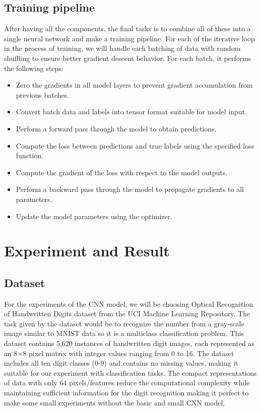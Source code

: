 \documentclass[conference]{IEEEtran}
\begin{document}
\subsection{Training pipeline} After having all the components, the final tasks is to combine all of these into a single neural network and make a training pipeline. For each of the iterative loop in the process of training, we will handle each batching of data with random shuffling to ensure better gradient descent behavior. For each batch, it performs the following steps:
\begin{itemize}
  \item Zero the gradients in all model layers to prevent gradient accumulation from previous batches.
  \item Convert batch data and labels into tensor format suitable for model input.
  \item Perform a forward pass through the model to obtain predictions.
  \item Compute the loss between predictions and true labels using the specified loss function.
  \item Compute the gradient of the loss with respect to the model outputs.
  \item Perform a backward pass through the model to propagate gradients to all parameters.
  \item Update the model parameters using the optimizer.
\end{itemize}

\section{Experiment and Result}
\subsection{Dataset}
For the experiments of the CNN model, we will be choosing Optical Recognition of Handwritten Digits dataset from the UCI Machine Learning Repository. The task given by the dataset would be to recognize the number from a gray-scale image similar to MNIST data so it is a multiclass classification problem. This dataset contains 5,620 instances of handwritten digit images, each represented as an 8×8 pixel matrix with integer values ranging from 0 to 16. The dataset includes all ten digit classes (0-9) and contains no missing values, making it suitable for our experiment with classification tasks. The compact representations of data with only 64 pixels/features reduce the computational complexity while maintaining sufficient information for the digit recognition making it perfect to make some small experiments without the basic and small CNN model.
\end{document}
